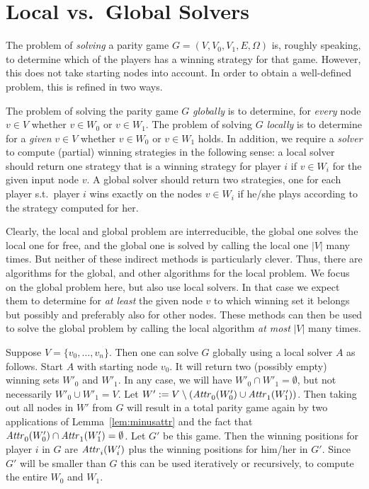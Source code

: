 \section{Local vs.\ Global Solvers}

The problem of \emph{solving} a parity game $G = (V,V_0,V_1,E,\Omega)$ is, roughly speaking, to determine
which of the players has a winning strategy for that game. However, this does not take starting nodes into
account. In order to obtain a well-defined problem, this is refined in two ways.

The problem of solving the parity game $G$ \emph{globally} is to determine, for \emph{every} node $v \in V$
whether $v \in W_0$ or $v \in W_1$. The problem of solving $G$ \emph{locally} is to determine for a
\emph{given} $v \in V$ whether $v \in W_0$ or $v \in W_1$ holds. In addition, we require a \emph{solver}
to compute (partial) winning strategies in the following sense: a local solver should return one strategy
that is a winning strategy for player $i$ if $v \in W_i$ for the given input node $v$. A global solver
should return two strategies, one for each player s.t.\ player $i$ wins exactly on the nodes $v \in W_i$
if he/she plays according to the strategy computed for her.

Clearly, the local and global problem are interreducible, the global one solves the local one for free,
and the global one is solved by calling the local one $|V|$ many times. But neither of these indirect
methods is particularly clever. Thus, there are algorithms for the global, and other algorithms for the
local problem. We focus on the global problem here, but also use local solvers. In that case we expect
them to determine for \emph{at least} the given node $v$ to which winning set it belongs but possibly and
preferably also for other nodes. These methods can then be used to solve the global problem by calling
the local algorithm \emph{at most} $|V|$ many times.

Suppose $V = \{v_0,\ldots,v_n\}$. Then one can solve $G$ globally using a local solver $A$ as follows.
Start $A$ with starting node $v_0$. It will return two (possibly empty) winning sets $W'_0$ and $W'_1$.
In any case, we will have $W'_0 \cap W'_1 = \emptyset$, but not necessarily $W'_0 \cup W'_1 = V$. Let
$W' := V \setminus (\mathit{Attr}^{}_{0}(W'_0) \cup \mathit{Attr}^{}_{1}(W'_1))$. Then taking out all nodes in $W'$ from $G$
will result in a total parity game again by two applications of Lemma~\ref{lem:minusattr} and the fact
that $\mathit{Attr}^{}_{0}(W'_0) \cap \mathit{Attr}^{}_{1}(W'_1) = \emptyset$. Let $G'$ be this game. Then the winning positions
for player $i$ in $G$ are $\mathit{Attr}^{}_{i}(W'_i)$ plus the winning positions for him/her in $G'$. Since $G'$
will be smaller than $G$ this can be used iteratively or recursively, to compute the entire $W_0$ and $W_1$.

